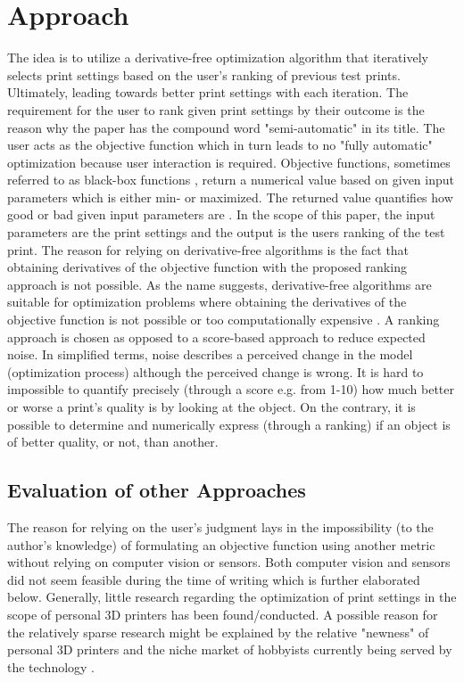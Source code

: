 \section{Approach}

The idea is to utilize a derivative-free optimization algorithm that iteratively selects print settings based on the user's ranking of previous test prints. Ultimately, leading towards better print settings with each iteration. The requirement for the user to rank given print settings by their outcome is the reason why the paper has the compound word "semi-automatic" in its title. The user acts as the objective function which in turn leads to no "fully automatic" optimization because user interaction is required. Objective functions, sometimes referred to as black-box functions \cite{agnihotri2020exploring, larson2019derivative}, return a numerical value based on given input parameters which is either min- or maximized. The returned value quantifies how good or bad given input parameters are \cite{rios2013derivative}. In the scope of this paper, the input parameters are the print settings and the output is the users ranking of the test print. The reason for relying on derivative-free algorithms is the fact that obtaining derivatives of the objective function with the proposed ranking approach is not possible. As the name suggests, derivative-free algorithms are suitable for optimization problems where obtaining the derivatives of the objective function is not possible or too computationally expensive \cite{rios2013derivative}. A ranking approach is chosen as opposed to a score-based approach to reduce expected noise. In simplified terms, noise describes a perceived change in the model (optimization process) although the perceived change is wrong. It is hard to impossible to quantify precisely (through a score e.g. from 1-10) how much better or worse a print's quality is by looking at the object. On the contrary, it is possible to determine and numerically express (through a ranking) if an object is of better quality, or not, than another.

\subsection{Evaluation of other Approaches}
The reason for relying on the user's judgment lays in the impossibility (to the author's knowledge) of formulating an objective function using another metric without relying on computer vision or sensors. Both computer vision and sensors did not seem feasible during the time of writing which is further elaborated below. Generally, little research regarding the optimization of print settings in the scope of personal 3D printers has been found/conducted. A possible reason for the relatively sparse research might be explained by the relative "newness" of personal 3D printers and the niche market of hobbyists currently being served by the technology \cite{sauramo2014proliferation, khan2020real}.

